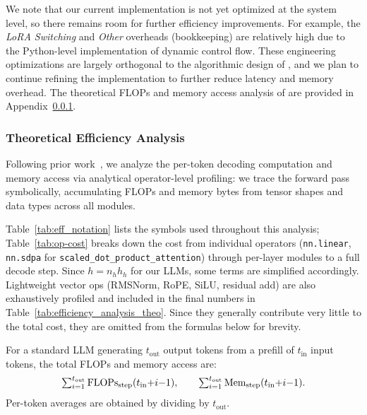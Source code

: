 We note that our current implementation is not yet optimized at the system level, so there remains room for further efficiency improvements.
For example, the \textit{LoRA Switching} and \textit{Other} overheads (bookkeeping) are relatively high due to the Python-level implementation of dynamic control flow.
These engineering optimizations are largely orthogonal to the algorithmic design of \name, and we plan to continue refining the implementation to further reduce latency and memory overhead.
The theoretical FLOPs and memory access analysis of \name are provided in Appendix~\ref{sec:appendix/exp/theo_eff}.


\subsubsection{Theoretical Efficiency Analysis}
\label{sec:appendix/exp/theo_eff}

Following prior work~\cite{hoffmann2022training, yang2024glitches, wenheng2025cdllm}, we analyze the per-token decoding computation and memory access via analytical operator-level profiling: we trace the forward pass symbolically, accumulating FLOPs and memory bytes from tensor shapes and data types across all modules.

Table~\ref{tab:eff_notation} lists the symbols used throughout this analysis;
Table~\ref{tab:op-cost} breaks down the cost from individual operators (\texttt{nn.linear}, \texttt{nn.sdpa} for \texttt{scaled\_dot\_product\_attention}) through per-layer modules to a full decode step. Since $h=n_h h_h$ for our LLMs, some terms are simplified accordingly.
Lightweight vector ops (RMSNorm, RoPE, SiLU, residual add) are also exhaustively profiled and included in the final numbers in Table~\ref{tab:efficiency_analysis_theo}. Since they generally contribute very little to the total cost, they are omitted from the formulas below for brevity.

For a standard LLM generating $t_\text{out}$ output tokens from a prefill of $t_\text{in}$ input tokens, the total FLOPs and memory access are:
\begin{align}
  \textstyle\sum_{i=1}^{t_\text{out}} \mathrm{FLOPs}_\text{step}(t_\text{in}{+}i{-}1), \qquad
  \textstyle\sum_{i=1}^{t_\text{out}} \mathrm{Mem}_\text{step}(t_\text{in}{+}i{-}1).
\end{align}
Per-token averages are obtained by dividing by $t_\text{out}$.

